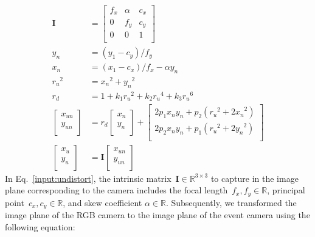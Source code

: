 \begin{equation}
\begin{aligned}
\textbf{I}&=\begin{bmatrix}
 f_{x} & \alpha & c_{x}  \\
 0 & f_{y} & c_{y}  \\
 0 & 0 & 1  \\
\end{bmatrix} \\
y_{n}&=(y_{1}-c_{y})/f_{y} \\
x_{n}&=(x_{1}-c_{x})/f_{x}-\alpha{y_{n}} \\
{r_{u}}^{2}&={x_{n}}^{2}+{y_{n}}^{2} \\
r_{d}&=1+k_{1}{r_{u}}^{2}+k_{2}{r_{u}}^{4}+k_{3}{r_{u}}^{6} \\
\begin{bmatrix}
 x_{un} \\
 y_{un} \\
\end{bmatrix}&=r_{d}\begin{bmatrix}
 x_{n} \\
 y_{n} \\
\end{bmatrix}+\begin{bmatrix}
 2p_{1}x_{n}y_{n}+p_{2}({r_{u}}^{2}+{2x_{n}}^{2}) \\
 2p_{2}x_{n}y_{n}+p_{1}({r_{u}}^{2}+{2y_{n}}^{2}) \\
\end{bmatrix} \\
\begin{bmatrix}
 x_{u} \\
 y_{u} \\
\end{bmatrix}&=\textbf{I}\begin{bmatrix}
 x_{un} \\
 y_{un} \\
\end{bmatrix}
\end{aligned}
\label{input:undistort}
\end{equation}
In Eq.~\ref{input:undistort}, the intrinsic matrix~$\textbf{I} \in \mathbb{R}^{3\times3}$ to capture in the image plane corresponding to the camera includes the focal length~$f_{x}, f_{y} \in \mathbb{R}$, principal point~$c_{x}, c_{y}  \in \mathbb{R}$, and skew coefficient $\alpha  \in \mathbb{R}$. Subsequently, we transformed the image plane of the RGB camera to the image plane of the event camera using the following equation:
